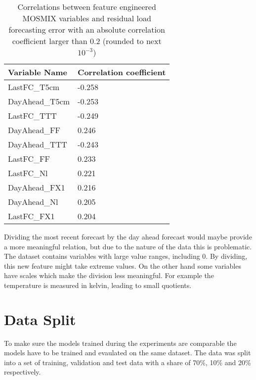 \documentclass[class=scrbook, crop=false]{standalone}
\begin{document}
    
    \begin{table}
    \centering
    \begin{tabular}{l|l}
    Variable Name	& Correlation coefficient \\\hline
	LastFC\_T5cm                        &-0.258\\
	DayAhead\_T5cm                      &-0.253\\
	LastFC\_TTT                         &-0.249\\
	DayAhead\_FF                         &0.246\\
	DayAhead\_TTT                       &-0.243\\
	LastFC\_FF                           &0.233\\
	LastFC\_Nl                           &0.221\\
	DayAhead\_FX1                        &0.216\\
	DayAhead\_Nl                         &0.205\\
	LastFC\_FX1                          &0.204\\
    \end{tabular}
    
    \caption{Correlations between feature engineered MOSMIX variables and residual load forecasting error with an absolute correlation coefficient larger than $0.2$ (rounded to next $10^{-3}$)}
    \label{Table::residual_load_fce_MOSMIX_correlations}
    \end{table}

    Dividing the most recent forecast by the day ahead forecast would maybe provide a more meaningful relation, but due to the nature of the data this is problematic.
    The dataset contains variables with large value ranges, including 0. 
    By dividing, this new feature might take extreme values.
    On the other hand some variables have scales which make the division less meaningful.
    For example the temperature is measured in kelvin, leading to small quotients.

\section{Data Split}
\label{Section::Data_Split}

To make sure the models trained during the experiments are comparable the models have to be trained and evaulated on the same dataset.
The data was split into a set of training, validation and test data with a share of 70\%, 10\% and 20\% respectively.
\end{document}
